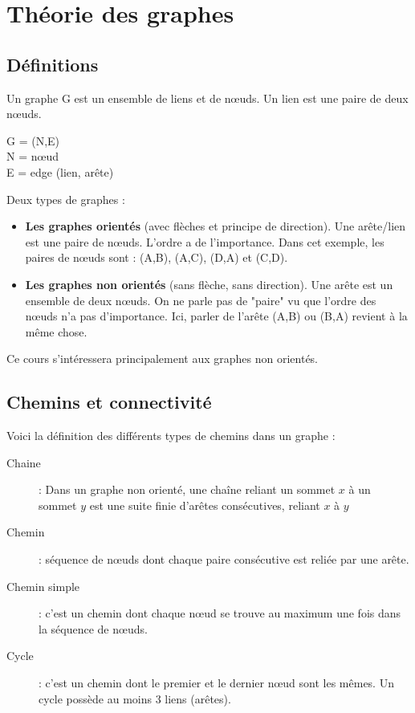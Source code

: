 \chapter{Théorie des graphes}

\section{Définitions}
Un graphe G est un ensemble de liens et de nœuds. Un lien est une paire de deux nœuds.
\begin{center}
	G = (N,E)\\
	N = n\oe ud\\
	E = edge (lien, arête)\\
\end{center}

Deux types de graphes :

\begin{itemize}
\item \textbf{Les graphes orientés} (avec flèches et principe de direction). Une arête/lien est une paire de nœuds. L'ordre a de l'importance. Dans cet exemple, les paires de nœuds sont : (A,B), (A,C), (D,A) et (C,D). 



\item \textbf{Les graphes non orientés} (sans flèche, sans direction).
    Une arête est un ensemble de deux n\oe uds. On ne parle pas de "paire"
    vu que l'ordre des nœuds n'a pas d'importance. Ici, parler de
    l'arête (A,B) ou (B,A) revient à la même chose.
\end{itemize}



\vspace{0.3cm}
Ce cours s'intéressera principalement aux graphes non orientés.

\section{Chemins et connectivité}
	Voici la définition des différents types de chemins dans un graphe :
	\begin{description}
	\item [Chaine] : Dans un graphe non orienté, une chaîne reliant un sommet $x$ à un sommet $y$ est une suite finie d'arêtes consécutives, reliant $x$ à $y$
	\item[Chemin]: séquence de n\oe uds dont chaque paire consécutive est reliée par une arête.
    	\item[Chemin simple]: c'est un chemin dont chaque n\oe ud se trouve au maximum une fois dans la séquence de n\oe uds.
    	\item[Cycle]: c'est un chemin dont le premier et le dernier n\oe ud sont les mêmes. Un cycle possède au moins 3 liens (arêtes).\\
	\end{description}

